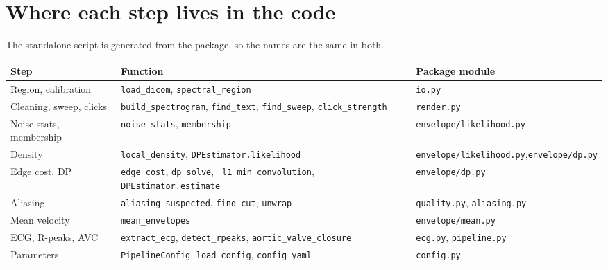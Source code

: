 \documentclass[11pt,a4paper]{article}
\newcommand{\code}[1]{\texttt{\small #1}}
\begin{document}
\section{Where each step lives in the code}
The standalone script is generated from the package, so the names are the same in both.
\begin{center}\small
\begin{tabularx}{\linewidth}{@{}>{\raggedright\arraybackslash}p{2.6cm}>{\raggedright\arraybackslash}X>{\raggedright\arraybackslash}p{4.0cm}@{}}
\toprule
Step & Function & Package module \\ \midrule
Region, calibration & \code{load\_dicom}, \code{spectral\_region} & \code{io.py} \\
Cleaning, sweep, clicks & \code{build\_spectrogram}, \code{find\_text}, \code{find\_sweep}, \code{click\_strength} & \code{render.py} \\
Noise stats, membership & \code{noise\_stats}, \code{membership} & \code{envelope/likelihood.py} \\
Density & \code{local\_density}, \code{DPEstimator.likelihood} & \code{envelope/likelihood.py},\newline \code{envelope/dp.py} \\
Edge cost, DP & \code{edge\_cost}, \code{dp\_solve}, \code{\_l1\_min\_convolution}, \code{DPEstimator.estimate} & \code{envelope/dp.py} \\
Aliasing & \code{aliasing\_suspected}, \code{find\_cut}, \code{unwrap} & \code{quality.py}, \code{aliasing.py} \\
Mean velocity & \code{mean\_envelopes} & \code{envelope/mean.py} \\
ECG, R-peaks, AVC & \code{extract\_ecg}, \code{detect\_rpeaks}, \code{aortic\_valve\_closure} & \code{ecg.py}, \code{pipeline.py} \\
Parameters & \code{PipelineConfig}, \code{load\_config}, \code{config\_yaml} & \code{config.py} \\
\bottomrule
\end{tabularx}
\end{center}
\end{document}
